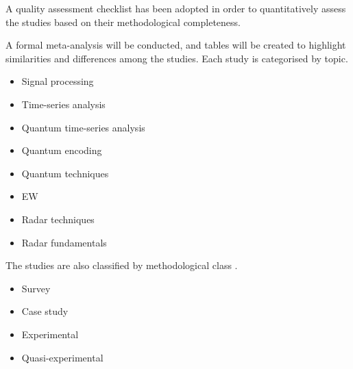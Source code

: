 A quality assessment checklist\cite{kitchenham_can_2010} has been adopted in order to quantitatively assess the studies based on their methodological completeness. 

A formal meta-analysis will be conducted, and tables will be created to highlight similarities and differences among the studies.
Each study is categorised by topic.
\begin{itemize}
    \item Signal processing
    \item Time-series analysis
    \item Quantum time-series analysis
    \item Quantum encoding
    \item Quantum techniques
    \item \ac{EW}
    \item Radar techniques
    \item Radar fundamentals
\end{itemize}

The studies are also classified by methodological class \cite{wohlin_empirical_2012}.
\begin{itemize}
    \item Survey
    \item Case study
    \item Experimental
    \item Quasi-experimental
\end{itemize}

